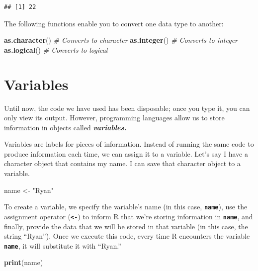 \documentclass[
]{book}
\newenvironment{Shaded}{\begin{snugshade}}{\end{snugshade}}
\newcommand{\CommentTok}[1]{\textcolor[rgb]{0.56,0.35,0.01}{\textit{#1}}}
\newcommand{\FunctionTok}[1]{\textcolor[rgb]{0.13,0.29,0.53}{\textbf{#1}}}
\newcommand{\NormalTok}[1]{#1}
\newcommand{\OtherTok}[1]{\textcolor[rgb]{0.56,0.35,0.01}{#1}}
\newcommand{\StringTok}[1]{\textcolor[rgb]{0.31,0.60,0.02}{#1}}
\begin{document}
\begin{verbatim}
## [1] 22
\end{verbatim}

The following functions enable you to convert one data type to another:

\begin{Shaded}
\begin{Highlighting}[]
\FunctionTok{as.character}\NormalTok{()  }\CommentTok{\# Converts to character}
\FunctionTok{as.integer}\NormalTok{()    }\CommentTok{\# Converts to integer}
\FunctionTok{as.logical}\NormalTok{()    }\CommentTok{\# Converts to logical}
\end{Highlighting}
\end{Shaded}

\section{Variables}\label{variables}

Until now, the code we have used has been disposable; once you type it, you can only view its output. However, programming languages allow us to store information in objects called \textbf{\emph{variables.}}

Variables are labels for pieces of information. Instead of running the same code to produce information each time, we can assign it to a variable. Let's say I have a character object that contains my name. I can save that character object to a variable.

\begin{Shaded}
\begin{Highlighting}[]
\NormalTok{name }\OtherTok{\textless{}{-}} \StringTok{"Ryan"}
\end{Highlighting}
\end{Shaded}

To create a variable, we specify the variable's name (in this case, \textbf{\texttt{name}}), use the assignment operator (\textbf{\texttt{\textless{}-}}) to inform R that we're storing information in \textbf{\texttt{name}}, and finally, provide the data that we will be stored in that variable (in this case, the string ``Ryan''). Once we execute this code, every time R encounters the variable \textbf{\texttt{name}}, it will substitute it with ``Ryan.''

\begin{Shaded}
\begin{Highlighting}[]
\FunctionTok{print}\NormalTok{(name)}
\end{Highlighting}
\end{Shaded}
\end{document}
